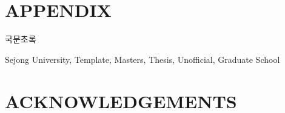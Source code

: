 \documentclass{sju}
\begin{document}



\chapter*{APPENDIX}

\begin{korabstract}
국문초록
\end{korabstract}
\begin{korkeywords}
Sejong University, Template, Masters, Thesis, Unofficial, Graduate School
\end{korkeywords}

\chapter*{ACKNOWLEDGEMENTS}
\end{document}
